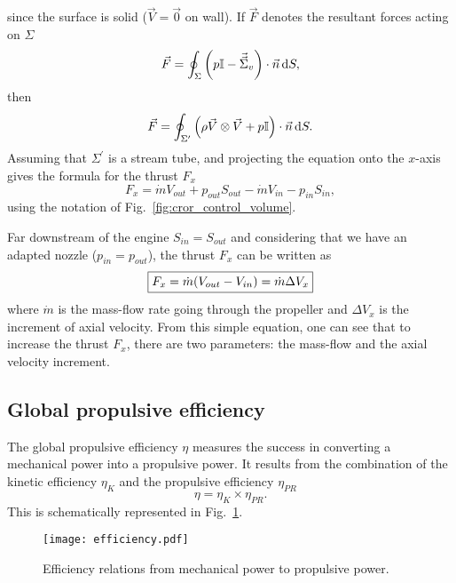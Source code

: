 since the surface is solid ($\vec{V} = \vec{0}$ on wall). 
If $\vec{F}$ denotes the resultant forces acting on $\Sigma$
\begin{equation}
	\vec{F} = \oint_{\Sigma} \left(p \mathbb{I} - 
	\vec{\vec{\Sigma}}_v \right) \cdot \vec{n} \mathop{}\!\mathrm{d} S,
\end{equation}
then
\begin{equation}
	\vec{F} = \oint_{\Sigma^\prime} \left(\rho \vec{V} \otimes \vec{V} +
	p \mathbb{I} \right) \cdot \vec{n} \mathop{}\!\mathrm{d} S.
\end{equation}
Assuming that $\Sigma^\prime$ is a stream tube, and projecting the equation
onto the $x$-axis gives the formula for the thrust $F_x$
\begin{equation}
	F_x = \dot{m} V_{out} + p_{out} S_{out}
	- \dot{m} V_{in} - p_{in} S_{in},
\end{equation}
using the notation of Fig.~\ref{fig:cror_control_volume}.

Far downstream of the engine $S_{in} = S_{out}$ and
considering that we have an adapted nozzle ($p_{in} = p_{out}$),
the thrust $F_x$ can be written as
\begin{equation}
	\fbox{$
	F_x = \dot{m} (V_{out} - V_{in}) = \dot{m} \Delta V_x
	$}
	\label{eq:cror_thrust}
\end{equation}
where $\dot{m}$ is the mass-flow rate going through the
propeller and $\Delta V_x$ is
the increment of axial velocity. From this simple equation,
one can see that to increase the thrust $F_x$, there are two parameters:
the mass-flow and the axial velocity increment.

\subsection{Global propulsive efficiency}
\label{sub:cror_efficiency}

The global propulsive efficiency $\eta$ measures the 
success in converting a mechanical power into a
propulsive power. It results from the combination
of the kinetic efficiency $\eta_{K}$ and the propulsive efficiency
$\eta_{PR}$
\begin{equation}
	\eta = \eta_{K} \times \eta_{PR}.
\end{equation}
This is schematically represented in Fig.~\ref{fig:cror_efficiency}.
\begin{figure}[htp]
  \centering
  \texttt{[image: efficiency.pdf]}
  \caption{Efficiency relations from mechanical power to propulsive power.}
  \label{fig:cror_efficiency}
\end{figure}

